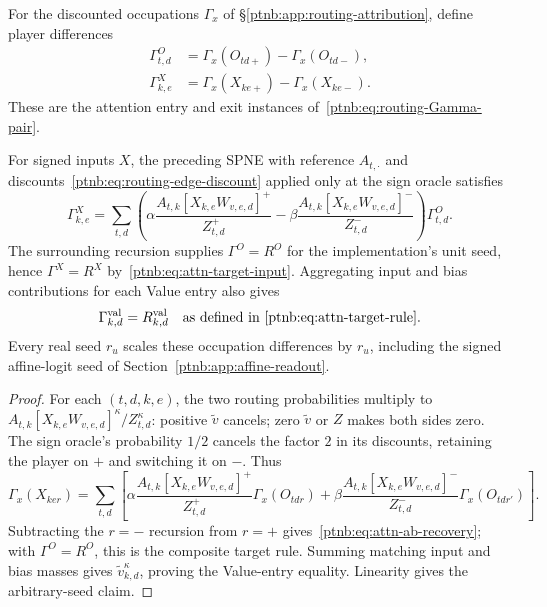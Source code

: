 For the discounted occupations $\Gamma_x$ of \S\ref{ptnb:app:routing-attribution}, define player differences
\begin{align}
    \Gamma^O_{t,d}&=\Gamma_x(O_{td+})-\Gamma_x(O_{td-}),\label{ptnb:eq:attn-Gamma-O}\\
    \Gamma^X_{k,e}&=\Gamma_x(X_{ke+})-\Gamma_x(X_{ke-}).\label{ptnb:eq:attn-Gamma-X}
\end{align}
These are the attention entry and exit instances of~\eqref{ptnb:eq:routing-Gamma-pair}.

\begin{theoremenv}\label{ptnb:thm:attn-ab-recovery}\label{thm:attention_ab_recovery}\label{ptnb:thm:attention}
For signed inputs $X$, the preceding SPNE with reference $A_{t,\cdot}$ and discounts~\eqref{ptnb:eq:routing-edge-discount} applied only at the sign oracle satisfies
\begin{equation}\label{ptnb:eq:attn-ab-recovery}
    \Gamma^X_{k,e}=\sum_{t,d}\left(
       \alpha\frac{A_{t,k}[X_{k,e}W_{v,e,d}]^+}{Z_{t,d}^+}
       -\beta\frac{A_{t,k}[X_{k,e}W_{v,e,d}]^-}{Z_{t,d}^-}
       \right)\Gamma^O_{t,d}.
\end{equation}
The surrounding recursion supplies $\Gamma^O=R^O$ for the implementation's unit seed, hence $\Gamma^X=R^X$ by~\eqref{ptnb:eq:attn-target-input}. Aggregating input and bias contributions for each Value entry also gives
\begin{equation}\label{ptnb:eq:attn-Gamma-V-corollary}
    \Gamma^{\mathrm{val}}_{k,d}=R^{\mathrm{val}}_{k,d}
    \quad\text{as defined in~\eqref{ptnb:eq:attn-target-rule}}.
\end{equation}
Every real seed $r_u$ scales these occupation differences by $r_u$, including the signed affine-logit seed of Section~\ref{ptnb:app:affine-readout}.
\end{theoremenv}
\begin{proof}
For each $(t,d,k,e)$, the two routing probabilities multiply to $A_{t,k}[X_{k,e}W_{v,e,d}]^\kappa/Z_{t,d}^\kappa$: positive $\tilde v$ cancels; zero $\tilde v$ or $Z$ makes both sides zero. The sign oracle's probability $1/2$ cancels the factor $2$ in its discounts, retaining the player on $+$ and switching it on $-$. Thus
\begin{equation}\label{ptnb:eq:attn-Gamma-X-recursion}
    \Gamma_x(X_{ker})=\sum_{t,d}\left[
      \alpha\frac{A_{t,k}[X_{k,e}W_{v,e,d}]^+}{Z_{t,d}^+}\Gamma_x(O_{tdr})
      +\beta\frac{A_{t,k}[X_{k,e}W_{v,e,d}]^-}{Z_{t,d}^-}\Gamma_x(O_{tdr'})
    \right].
\end{equation}
Subtracting the $r=-$ recursion from $r=+$ gives~\eqref{ptnb:eq:attn-ab-recovery}; with $\Gamma^O=R^O$, this is the composite target rule. Summing matching input and bias masses gives $\tilde v_{k,d}^\kappa$, proving the Value-entry equality. Linearity gives the arbitrary-seed claim.
\end{proof}

